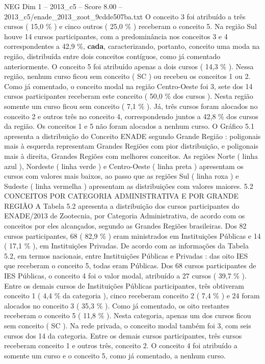 \begin{textsample}{NEG Dim 1 – 2013\_c5 – Score 8.00 – 2013\_c5/enade\_2013\_zoot\_9cdde507ba.txt}
O conceito 3 foi atribuído a três cursos ( 15,0 \% ) e cinco outros ( 25,0 \% ) receberam o conceito 5.
Na região Sul houve 14 cursos participantes, com a predominância nos conceitos 3 e 4 correspondentes a 42,9 \%, \textbf{cada}, caracterizando, portanto, conceito uma moda na região, distribuída entre dois conceitos contíguos, como já comentado anteriormente.
O conceito 5 foi atribuído apenas a dois cursos ( 14,3 \% ).
Nessa região, nenhum curso ficou sem conceito ( SC ) ou recebeu os conceitos 1 ou 2.
Como já comentado, o conceito modal na região Centro-Oeste foi 3, sete dos 14 cursos participantes receberam este conceito ( 50,0 \% dos cursos ).
Nesta região somente um curso ficou sem conceito ( 7,1 \% ).
Já, três cursos foram alocados no conceito 2 e outros três no conceito 4, correspondendo juntos a 42,8 \% dos cursos da região.
Os conceitos 1 e 5 não foram alocados a nenhum curso.
O Gráfico 5.1 apresenta a distribuição do Conceito ENADE segundo Grande Região : poligonais mais à esquerda representam Grandes Regiões com pior distribuição, e poligonais mais à direita, Grandes Regiões com melhores conceitos.
As regiões Norte ( linha azul ), Nordeste ( linha verde ) e Centro-Oeste ( linha preta ) apresentam os cursos com valores mais baixos, ao passo que as regiões Sul ( linha roxa ) e Sudeste ( linha vermelha ) apresentam as distribuições com valores maiores. 5.2 CONCEITOS POR CATEGORIA ADMINISTRATIVA E POR GRANDE REGIÃO A Tabela 5.2 apresenta a distribuição dos cursos participantes do ENADE/2013 de Zootecnia, por Categoria Administrativa, de acordo com os conceitos por eles alcançados, segundo as Grandes Regiões brasileiras.
Dos 82 cursos participantes, 68 ( 82,9 \% ) eram ministrados em Instituições Públicas e 14 ( 17,1 \% ), em Instituições Privadas.
De acordo com as informações da Tabela 5.2, em termos nacionais, entre Instituições Públicas e Privadas : das oito IES que receberam o conceito 5, todas eram Públicas.
Dos 68 cursos participantes de IES Públicas, o conceito 4 foi o valor modal, atribuído a 27 cursos ( 39,7 \% ).
Entre os demais cursos de Instituições Públicas participantes, três obtiveram conceito 1 ( 4,4 \% da categoria ), cinco receberam conceito 2 ( 7,4 \% ) e 24 foram alocados no conceito 3 ( 35,3 \% ).
Como já comentado, os oito restantes receberam o conceito 5 ( 11,8 \% ).
Nesta categoria, apenas um dos cursos ficou sem conceito ( SC ).
Na rede privada, o conceito modal também foi 3, com seis cursos dos 14 da categoria.
Entre os demais cursos participantes, três cursos receberam conceito 1 e outros três, conceito 2.
O conceito 4 foi atribuído a somente um curso e o conceito 5, como já comentado, a nenhum curso.

\end{textsample}
